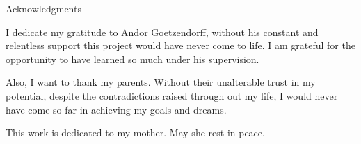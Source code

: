\thispagestyle{empty}

\vspace*{20mm}

\begin{center}
{ Acknowledgments}
\end{center}

\vspace{10mm}

I dedicate my gratitude to Andor Goetzendorff, without his constant and relentless support this project would have never come to life. I am grateful for the opportunity to have learned so much under his supervision.


Also, I want to thank my parents. Without their unalterable trust in my potential, despite the contradictions raised through out my life, I would never have come so far in achieving my goals and dreams. 

This work is dedicated to my mother. May she rest in peace.

\cleardoublepage{}
